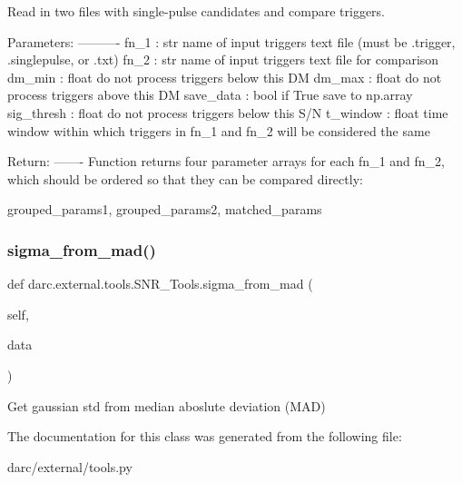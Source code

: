 \begin{DoxyVerb}Read in two files with single-pulse candidates
and compare triggers.

Parameters:
----------
fn_1 : str 
    name of input triggers text file
    (must be .trigger, .singlepulse, or .txt)
fn_2 : str
    name of input triggers text file for comparison 
dm_min : float
    do not process triggers below this DM 
dm_max : float 
    do not process triggers above this DM 
save_data : bool 
    if True save to np.array
sig_thresh : float 
    do not process triggers below this S/N 
t_window : float 
    time window within which triggers in 
    fn_1 and fn_2 will be considered the same 

Return:
-------
Function returns four parameter arrays for 
each fn_1 and fn_2, which should be ordered so 
that they can be compared directly:

grouped_params1, grouped_params2, matched_params
\end{DoxyVerb}
 \mbox{\label{classdarc_1_1external_1_1tools_1_1_s_n_r___tools_a0d702d754a0292c33de8f7ef097a8cff}} 
\subsubsection{\texorpdfstring{sigma\_from\_mad()}{sigma\_from\_mad()}}
{\footnotesize\ttfamily def darc.\+external.\+tools.\+S\+N\+R\+\_\+\+Tools.\+sigma\+\_\+from\+\_\+mad (\begin{DoxyParamCaption}\item[{}]{self,  }\item[{}]{data }\end{DoxyParamCaption})}

\begin{DoxyVerb}Get gaussian std from median 
aboslute deviation (MAD)
\end{DoxyVerb}
 

The documentation for this class was generated from the following file\+:\begin{DoxyCompactItemize}
\item 
darc/external/tools.\+py\end{DoxyCompactItemize}
